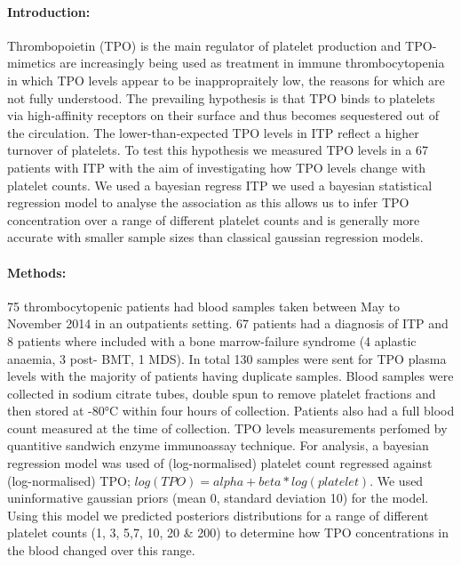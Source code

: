 \documentclass[11pt]{article}
\title{}
\author{George Adams .... Nichola Cooper}
\date{July 2018}
\begin{document}
\maketitle

\paragraph{Introduction:} Thrombopoietin (TPO) is the main regulator of platelet production and TPO-mimetics are increasingly being used as treatment in immune thrombocytopenia in which TPO levels appear to be inappropraitely low, the reasons for which are not fully understood. The prevailing hypothesis is that TPO binds to platelets via high-affinity receptors on their surface and thus becomes sequestered out of the circulation. The lower-than-expected TPO levels in ITP reflect a higher turnover of platelets. To test this hypothesis we measured TPO levels in a 67 patients with ITP with the aim of investigating how TPO levels change with platelet counts. We used a bayesian regress ITP we used a bayesian statistical regression model to analyse the association as this allows us to infer TPO concentration over a range of different platelet counts and is generally more accurate with smaller sample sizes than classical gaussian regression models.


\paragraph{Methods:} 75 thrombocytopenic patients had blood samples taken between May to November 2014 in an outpatients setting. 67 patients had a diagnosis of ITP and 8 patients where included with a bone marrow-failure syndrome (4 aplastic anaemia, 3 post- BMT, 1 MDS). In total 130 samples were sent for TPO plasma levels with the majority of patients having duplicate samples. Blood samples were collected in sodium citrate tubes, double spun to remove platelet fractions and then stored at -80°C within four hours of collection. Patients also had a full blood count measured at the time of collection. TPO levels measurements perfomed by quantitive sandwich enzyme immunoassay technique. For analysis, a bayesian regression model was used of (log-normalised) platelet count regressed against (log-normalised) TPO; $log(TPO) = alpha + beta*log(platelet)$. We used uninformative gaussian priors (mean 0, standard deviation 10) for the model. Using this model we predicted posteriors distributions for a range of different platelet counts (1, 3, 5,7, 10, 20 & 200) to determine how TPO concentrations in the blood changed over this range.
\end{document}
